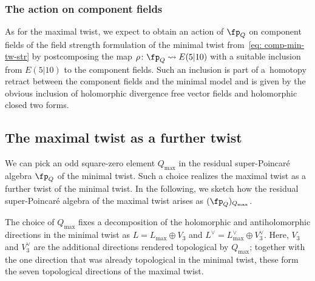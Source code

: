 \documentclass[10pt,a4paper]{amsart}
\numberwithin{equation}{section}
\theoremstyle{definition}
\begin{document}
\subsubsection{The action on component fields}
As for the maximal twist, we expect to obtain an action of $\fp_Q$ on component fields of the field strength formulation of the minimal twist from~\eqref{eq: comp-min-tw-str} by postcomposing the map $\rho\colon \fp_Q\rightsquigarrow E(5|10)$ with a suitable inclusion from $E(5|10)$ to the component fields. Such an inclusion is part of a~homotopy retract between the component fields and the minimal model and is given by the obvious inclusion of holomorphic divergence free vector fields and holomorphic closed two forms.

\subsection{The maximal twist as a further twist} \label{sec: further}
We can pick an odd square-zero element $Q_{\max}$ in the residual super-Poincar\'e algebra $\fp_Q$ of the minimal twist. Such a choice realizes the maximal twist as a further twist of the minimal twist. In the following, we sketch how the residual super-Poincar\'e algebra of the maximal twist arises as $(\fp_Q)_{Q_{\max}}$.

The choice of $Q_{\max}$ fixes a decomposition of the holomorphic and antiholomorphic directions in the minimal twist as
$
 L = L_{\max} \oplus V_3 $ and $L^\vee = L^\vee_{\max} \oplus V_3^\vee$.
Here, $V_3$ and $V_3^\vee$ are the additional directions rendered topological by $Q_{\max}$; together with the one direction that was already topological in the minimal twist, these form the seven topological directions of the maximal twist.
\end{document}
